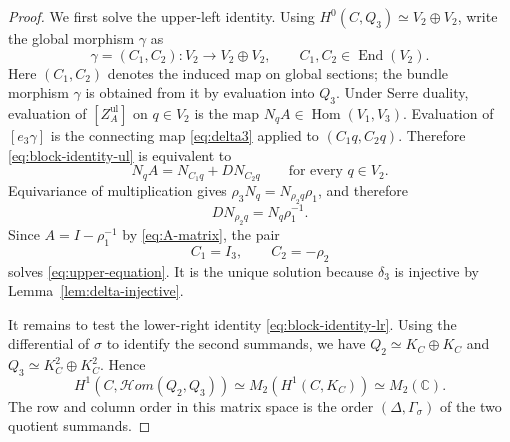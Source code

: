 \documentclass[10pt,a4paper]{amsart}
\newcommand{\CC}{\mathbb C}
\newcommand{\End}{\operatorname{End}}
\newcommand{\Hom}{\operatorname{Hom}}
\newcommand{\cHom}{\mathcal{H}om}
\begin{document}
\begin{proof}
We first solve the upper-left identity.  Using
$H^0(C,Q_3)\simeq V_2\oplus V_2$, write the global morphism $\gamma$ as
\begin{equation}\label{eq:gamma-C1C2}
 \gamma=(C_1,C_2):V_2\longrightarrow V_2\oplus V_2,
 \qquad C_1,C_2\in\End(V_2).
\end{equation}
Here $(C_1,C_2)$ denotes the induced map on global sections;
the bundle morphism $\gamma$ is obtained from it by evaluation into $Q_3$.
Under Serre duality, evaluation of
$[Z_A^{\mathrm{ul}}]$ on $q\in V_2$ is the map
$N_qA\in\Hom(V_1,V_3)$.  Evaluation of $[e_3\gamma]$ is the connecting
map \eqref{eq:delta3} applied to $(C_1q,C_2q)$.  Therefore
\eqref{eq:block-identity-ul} is equivalent to
\begin{equation}\label{eq:upper-equation}
 N_qA=N_{C_1q}+DN_{C_2q}
 \qquad\text{for every }q\in V_2.
\end{equation}
Equivariance of multiplication gives
$\rho_3N_q=N_{\rho_2q}\rho_1$, and therefore
$$
 DN_{\rho_2q}=N_q\rho_1^{-1}.
$$
Since $A=I-\rho_1^{-1}$ by \eqref{eq:A-matrix}, the pair
\begin{equation}\label{eq:C1C2}
 C_1=I_3,
 \qquad
 C_2=-\rho_2
\end{equation}
solves \eqref{eq:upper-equation}.  It is the unique solution because
$\delta_3$ is injective by Lemma~\ref{lem:delta-injective}.

It remains to test the lower-right identity
\eqref{eq:block-identity-lr}.  Using the differential of $\sigma$ to
identify the second summands, we have
$Q_2\simeq K_C\oplus K_C$ and
$Q_3\simeq K_C^2\oplus K_C^2$.  Hence
\begin{equation}\label{eq:lower-target}
 H^1\!\left(C,\cHom(Q_2,Q_3)\right)
 \simeq M_2\!\left(H^1(C,K_C)\right)
 \simeq M_2(\CC).
\end{equation}
The row and column order in this matrix space is the order
$(\Delta,\Gamma_\sigma)$ of the two quotient summands.


\end{proof}
\end{document}
